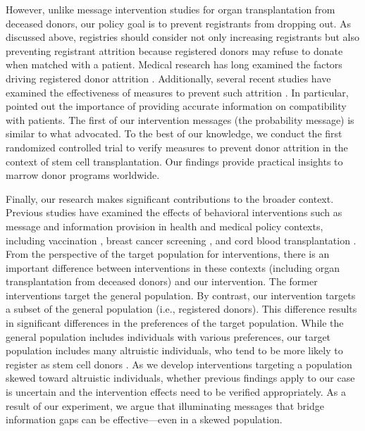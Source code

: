 \documentclass[12pt, a4paper]{article}
\begin{document}
However, unlike message intervention studies for organ transplantation from deceased donors, our policy goal is to prevent registrants from dropping out. As discussed above, registries should consider not only increasing registrants but also preventing registrant attrition because registered donors may refuse to donate when matched with a patient. Medical research has long examined the factors driving registered donor attrition \citep{Switzer2003, Switzer2004, Balassa2019, Hamed2023}. Additionally, several recent studies have examined the effectiveness of measures to prevent such attrition \citep{Switzer2018, Haylock2024}. In particular, \citet{Switzer2018} pointed out the importance of providing accurate information on compatibility with patients. The first of our intervention messages (the probability message) is similar to what \citet{Switzer2018} advocated. To the best of our knowledge, we conduct the first randomized controlled trial to verify measures to prevent donor attrition in the context of stem cell transplantation. Our findings provide practical insights to marrow donor programs worldwide.

Finally, our research makes significant contributions to the broader context. Previous studies have examined the effects of behavioral interventions such as message and information provision in health and medical policy contexts, including vaccination \citep[for example,][]{Dai2021, Milkman2021}, breast cancer screening \citep{Bertoni2020}, and cord blood transplantation \citep{Grieco2018}. From the perspective of the target population for interventions, there is an important difference between interventions in these contexts (including organ transplantation from deceased donors) and our intervention. The former interventions target the general population. By contrast, our intervention targets a subset of the general population (i.e., registered donors). This difference results in significant differences in the preferences of the target population. While the general population includes individuals with various preferences, our target population includes many altruistic individuals, who tend to be more likely to register as stem cell donors \citep{Bergstrom2009, Ohtake2020}. As we develop interventions targeting a population skewed toward altruistic individuals, whether previous findings apply to our case is uncertain and the intervention effects need to be verified appropriately. As a result of our experiment, we argue that illuminating messages that bridge information gaps can be effective---even in a skewed population.
\end{document}
